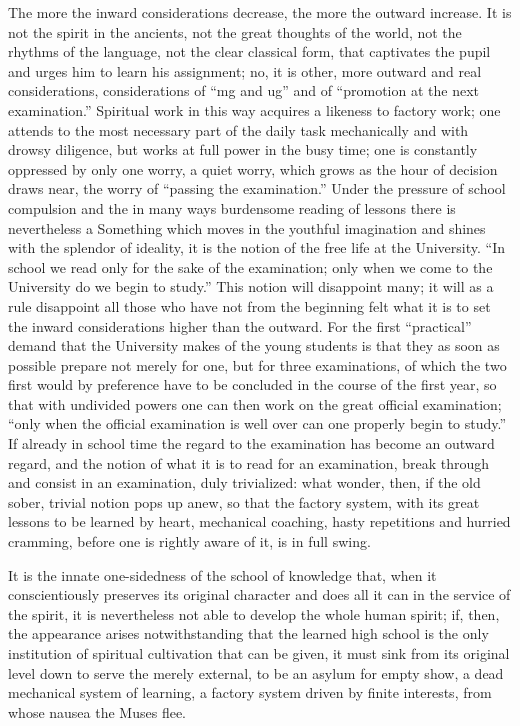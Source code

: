 \documentclass[12pt,a4paper,openany]{book}
\newcommand{\opage}[1]{\marginnote{\footnotesize\textit{[#1]}}}
\begin{document}
The more the inward considerations decrease, the more the
outward increase. It is not the spirit in the ancients, not the
\setcounter{footnote}{0}%
\opage{309}great thoughts of the world, not the rhythms of the language, not the
clear classical form, that captivates the pupil and urges
him to learn his assignment; no, it is other, more outward
and real considerations, considerations of ``mg and ug'' and of
``promotion at the next examination.'' Spiritual work in
this way acquires a likeness to factory work; one attends
to the most necessary part of the daily task mechanically
and with drowsy diligence, but works at full power in the busy
time; one is constantly oppressed by only one worry, a
quiet worry, which grows as the hour of decision
draws near, the worry of ``passing the examination.''
Under the pressure of school compulsion and the in many ways
burdensome reading of lessons there is nevertheless a Something which
moves in the youthful imagination and shines with
the splendor of ideality, it is the notion of the free
life at the University. ``In school we read only for the sake of the
examination; only when we come to the University do
we begin to study.'' This notion will disappoint
many; it will as a rule disappoint all those who have not
from the beginning felt what it is to
set the inward considerations higher than the outward.
For the first ``practical'' demand that the University makes
of the young students is that they as soon as possible
prepare not merely for one, but for three examinations, of
which the two first would by preference have to be concluded in the course of
the first year, so that with undivided powers one can then
work on the great official examination; ``only when the official examination
is well over can one properly begin
to study.'' If already in school time the regard to the examination
has become an outward regard, and the notion of what
it is to read for an examination, break through and
\setcounter{footnote}{0}%
\opage{310}consist in an examination, duly trivialized: what wonder, then, if the old sober, trivial notion
pops up anew, so that the factory system, with its great lessons to be learned by heart,
mechanical coaching, hasty repetitions and
hurried cramming, before one is rightly aware of it, is
in full swing.

It is the innate one-sidedness of the school of knowledge that,
when it conscientiously preserves its original
character and does all it can in the service of the spirit,
it is nevertheless not able to develop the whole human
spirit; if, then, the appearance arises notwithstanding that
the learned high school is the only institution of spiritual cultivation
that can be given, it must sink from its original
level down to serve the merely external, to be an
asylum for empty show, a dead mechanical system of learning, a factory system driven by finite interests, from
whose nausea the Muses flee.
\end{document}
